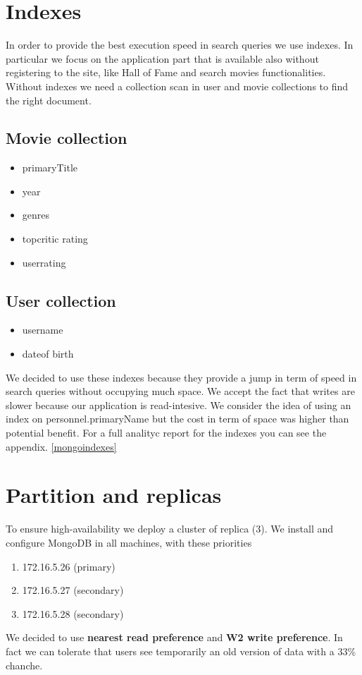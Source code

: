 \section{Indexes}
In order to provide the best execution speed in search queries we use indexes. In particular we focus on the application part that is available also without registering to the site, like Hall of Fame and search movies functionalities. Without indexes we need a collection scan in user and movie collections to find the right document. \\
\subsection{Movie collection}
\begin{itemize}
\item primaryTitle
\item year
\item genres
\item top\textunderscore critic \textunderscore rating
\item user\textunderscore rating
\end{itemize}


\subsection{User collection}
\begin{itemize}
\item username
\item date\textunderscore of \textunderscore birth
\end{itemize}


We decided to use these indexes because they provide a jump in term of speed in search queries without occupying much space. We accept the fact that writes are slower because our application is read-intesive. We consider the idea of using an index on personnel.primaryName but the cost in term of space was higher than potential benefit.
For a full analityc report for the indexes you can see the appendix. \cref{mongoindexes}
\section{Partition and replicas}
To ensure high-availability we deploy a cluster of replica (3). We install and configure MongoDB in all machines, with these priorities 
\begin{enumerate}
 \item 172.16.5.26 (primary)
 \item 172.16.5.27 (secondary)
 \item 172.16.5.28 (secondary)
 \end{enumerate} 
We decided to use \textbf{nearest read preference} and \textbf{W2 write preference}. In fact we can tolerate that users see temporarily an old version of data with a 33\% chanche. 

